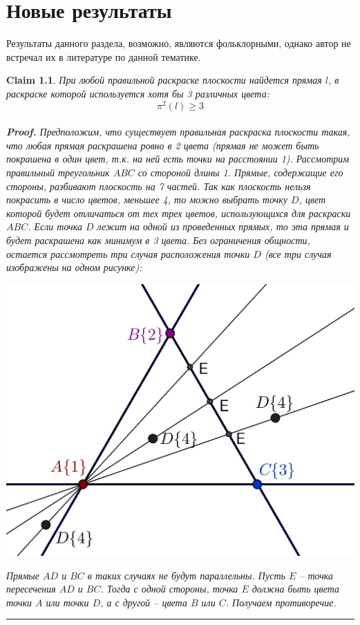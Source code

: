 \documentclass{report}%
\newtheorem{claim}[theorem]{Claim}
\newenvironment{proof}[1][Proof]{\textbf{#1.} }{\ \rule{0.5em}{0.5em}}
\begin{document}
\chapter{Новые результаты}

Результаты данного раздела, возможно, являются фольклорными, однако автор не встречал их в литературе по данной тематике.

\begin{claim}
		При любой правильной раскраске плоскости найдется прямая $l$, в раскраске которой используется хотя бы 3 различных цвета:
		\begin{equation}
				\pi^2(l) \geq 3
		\end{equation} \\
		\begin{proof}
				Предположим, что существует правильная раскраска плоскости такая,
				что любая прямая раскрашена ровно в 2 цвета (прямая не может быть покрашена в один цвет,
				т.к. на ней есть точки на расстоянии 1). Рассмотрим правильный треугольник $ABC$ со стороной длины 1.
				Прямые, содержащие его стороны, разбивают  плоскость на 7 частей.
				Так как плоскость нельзя покрасить в число цветов, меньшее 4, то можно выбрать точку $D$,
				цвет которой будет отличаться от тех трех цветов, использующихся для раскраски $ABC$.
				Если точка $D$ лежит на одной из проведенных прямых, то эта прямая и будет раскрашена как минимум в 3 цвета.
				Без ограничения общности, остается рассмотреть три случая расположения точки $D$ (все три случая изображены на одном рисунке): \\
				\begin{center}
						\includegraphics[scale = 0.5]{my_claim1}
				\end{center}
				
				Прямые $AD$ и $BC$ в таких случаях не будут параллельны. Пусть $E$ – точка пересечения $AD$ и $BC$.
				Тогда с одной стороны, точка $E$ должна быть цвета точки $A$ или точки $D$, а с другой – цвета $B$ или $C$. Получаем противоречие. 
		\end{proof}
\end{claim}
\end{document}
